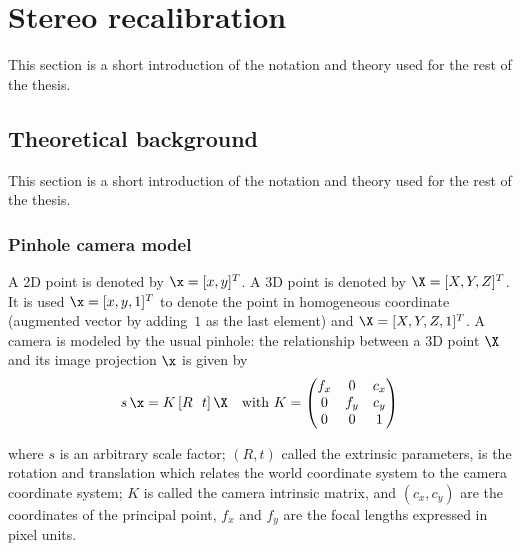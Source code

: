 \chapter{Stereo recalibration}
\label{cha:stereo_recalibration}

This section is a short introduction of the notation and theory used for the rest of the thesis.



\section{Theoretical background}
\label{sec:theoretical_background}

This section is a short introduction of the notation and theory used for the rest of the thesis.

\subsection{Pinhole camera model}

A 2D point is denoted by $\x = [x,y]^T$. A 3D point is denoted by $\X = [X,Y,Z]^T$. It is used $\x = [x,y,1]^T$ to denote the point in homogeneous coordinate (augmented vector by adding~$1$ as the last element) and $\X = [X,Y,Z,1]^T$. A camera is modeled by the usual pinhole: the relationship between a 3D point $\X$ and its image projection $\x$ is given by
\begin{equation} \label{eq:pinhole}
  s\,\x = K\, [R ~~ t]\,\X \quad \mbox{with } K =
    \begin{pmatrix}
      f_x & 0   & c_x \\
      0   & f_y & c_y \\
      0   & 0   & 1
\end{pmatrix}
\end{equation}

\noindent
where $s$ is an arbitrary scale factor; $(R,t)$ called the extrinsic parameters, is the rotation and translation which relates the world coordinate system to the camera coordinate system; $K$ is called the camera intrinsic matrix, and $(c_x,c_y)$ are the coordinates of the principal point, $f_x$ and $f_y$ are the focal lengths expressed in pixel units.




